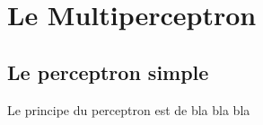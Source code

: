 \chapter{Le Multiperceptron}

\section{Le perceptron simple}
Le principe du perceptron est de bla bla bla